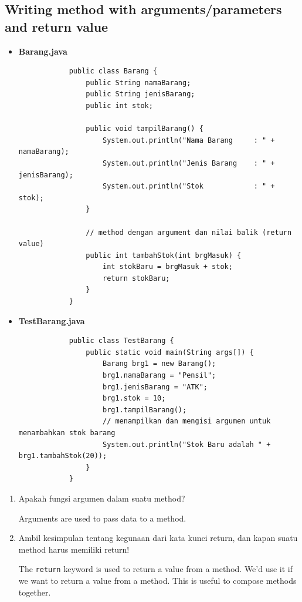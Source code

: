 \documentclass[12pt,titlepage]{article}
\begin{document}
\subsection{Writing method with arguments/parameters and return value}

\begin{itemize}
    \item {
        \textbf{Barang.java}

        \begin{verbatim}
            public class Barang {
                public String namaBarang;
                public String jenisBarang;
                public int stok;

                public void tampilBarang() {
                    System.out.println("Nama Barang     : " + namaBarang);
                    System.out.println("Jenis Barang    : " + jenisBarang);
                    System.out.println("Stok            : " + stok);
                }

                // method dengan argument dan nilai balik (return value)
                public int tambahStok(int brgMasuk) {
                    int stokBaru = brgMasuk + stok;
                    return stokBaru;
                }
            }
        \end{verbatim}
    }
    \item {
        \textbf{TestBarang.java}

        \begin{verbatim}
            public class TestBarang {
                public static void main(String args[]) {
                    Barang brg1 = new Barang();
                    brg1.namaBarang = "Pensil";
                    brg1.jenisBarang = "ATK";
                    brg1.stok = 10;
                    brg1.tampilBarang();
                    // menampilkan dan mengisi argumen untuk menambahkan stok barang
                    System.out.println("Stok Baru adalah " + brg1.tambahStok(20));
                }
            }
        \end{verbatim}
    }
\end{itemize}

\begin{enumerate}
    \item {
        Apakah fungsi argumen dalam suatu method?

        Arguments are used to pass data to a method.
    }
    \item {
        Ambil kesimpulan tentang kegunaan dari kata kunci return, dan kapan suatu method
        harus memiliki return!

        The \texttt{return} keyword is used to return a value from a method. We'd use it
        if we want to return a value from a method. This is useful to compose methods
        together.
    }
\end{enumerate}
\end{document}
